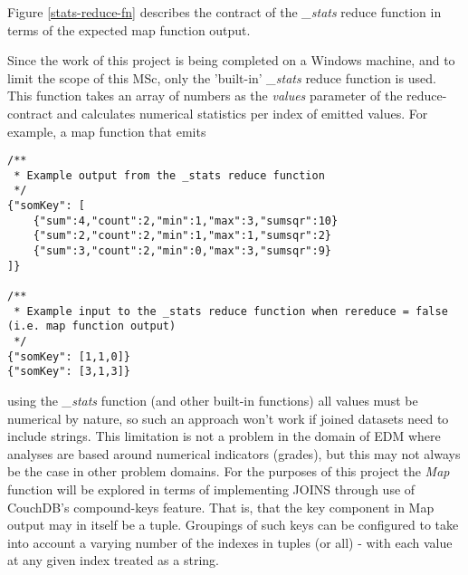 Figure \ref{stats-reduce-fn} describes the contract of the \textit{\_stats} reduce function in terms of the expected map function output.

Since the work of this project is being completed on a Windows machine, and to limit the scope of this MSc, only the 'built-in' \textit{\_stats} reduce function is used. This function takes an array of numbers as the \textit{values} parameter of the reduce-contract and calculates numerical statistics per index of emitted values. For example, a map function that emits

\begin{listing}[ht]
    \begin{verbatim}
/**
 * Example output from the _stats reduce function
 */
{"somKey": [
    {"sum":4,"count":2,"min":1,"max":3,"sumsqr":10}
    {"sum":2,"count":2,"min":1,"max":1,"sumsqr":2}
    {"sum":3,"count":2,"min":0,"max":3,"sumsqr":9}
]}

/**
 * Example input to the _stats reduce function when rereduce = false (i.e. map function output)
 */
{"somKey": [1,1,0]}
{"somKey": [3,1,3]}
\end{verbatim}
    \caption{}
    \label{stats-reduce-fn}
\end{listing}


using the \textit{\_stats} function (and other built-in functions) all values must be numerical by nature, so such an approach won't work if joined datasets need to include strings. This limitation is not a problem in the domain of EDM where analyses are based around numerical indicators (grades), but this may not always be the case in other problem domains. For the purposes of this project the \textit{Map} function will be explored in terms of implementing JOINS through use of CouchDB's compound-keys feature. That is, that the key component in Map output may in itself be a tuple. Groupings of such keys can be configured to take into account a varying number of the indexes in tuples (or all) - with each value at any given index treated as a string.

